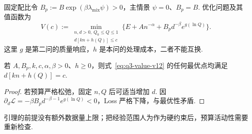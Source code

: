 固定配比令 $B_p:=B\exp(\beta\lambda_{\mathrm{mix}}\psi)>0$，主情景 $\psi=0$、$B_p=B$. 优化问题及其值函数为
\begin{equation}\label{eq:q3-value-v12}
V(c):=\min_{\substack{n,d>0,\ Q_0\le Q\le1\\d[kn+h(Q)]\le c}}
\{E+An^{-\alpha}+B_p d^{-\beta}e^{g(\ln Q)}\}.
\end{equation}
这里 $g$ 是第二问的质量响应，$h$ 是本问的处理成本，二者不能互换. 

\begin{lemma}[最优预算活动]\label{lem:q3-budget-active}
若 $A,B_p,k,c,\alpha,\beta>0$、$h\ge0$，则式~\eqref{eq:q3-value-v12} 的任何最优点均满足 $d[kn+h(Q)]=c$. 
\end{lemma}
\begin{proof}
若预算严格松弛，固定 $n,Q$ 后可适当增加 $d$. 因 $\partial_d\mathcal L=-\beta B_p d^{-\beta-1}e^{g(\ln Q)}<0$，Loss 严格下降，与最优性矛盾. 
\end{proof}
引理的前提没有额外数据量上限；把经验范围人为作为硬约束后，预算活动性需要重新检查. 

